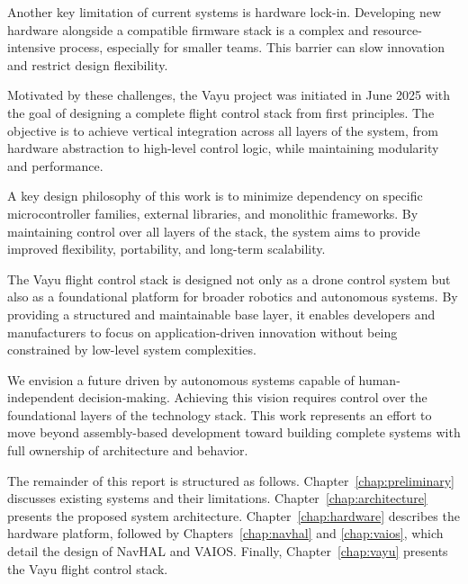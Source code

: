 Another key limitation of current systems is hardware lock-in. Developing new hardware alongside a compatible firmware stack is a complex and resource-intensive process, especially for smaller teams. This barrier can slow innovation and restrict design flexibility.

Motivated by these challenges, the Vayu project was initiated in June 2025 with the goal of designing a complete flight control stack from first principles. The objective is to achieve vertical integration across all layers of the system, from hardware abstraction to high-level control logic, while maintaining modularity and performance.

A key design philosophy of this work is to minimize dependency on specific microcontroller families, external libraries, and monolithic frameworks. By maintaining control over all layers of the stack, the system aims to provide improved flexibility, portability, and long-term scalability.

The Vayu flight control stack is designed not only as a drone control system but also as a foundational platform for broader robotics and autonomous systems. By providing a structured and maintainable base layer, it enables developers and manufacturers to focus on application-driven innovation without being constrained by low-level system complexities.

We envision a future driven by autonomous systems capable of human-independent decision-making. Achieving this vision requires control over the foundational layers of the technology stack. This work represents an effort to move beyond assembly-based development toward building complete systems with full ownership of architecture and behavior.

The remainder of this report is structured as follows. Chapter~\ref{chap:preliminary} discusses existing systems and their limitations. Chapter~\ref{chap:architecture} presents the proposed system architecture. Chapter~\ref{chap:hardware} describes the hardware platform, followed by Chapters~\ref{chap:navhal} and \ref{chap:vaios}, which detail the design of NavHAL and VAIOS. Finally, Chapter~\ref{chap:vayu} presents the Vayu flight control stack.